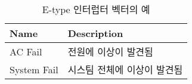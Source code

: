 %
%
\begin{table}[htbp]
\caption{E-type 인터럽터 벡터의 예}\label{table:e-type}
   \begin{center}
   \begin{tabular}{|l|l|} \hline
	Name & Description \\
\hline \hline
	AC Fail & 전원에 이상이 발견됨 \\
	System Fail & 시스팀 전체에 이상이 발견됨 \\
\hline
   \end{tabular}
   \end{center}
\end{table}
%
%

